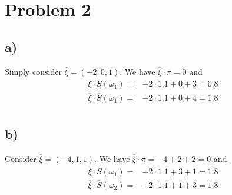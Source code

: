 \documentclass[a4paper]{article}
\theoremstyle{definition}
\begin{document}
\section*{Problem 2}
\subsection*{a)}
Simply consider \(\overline{\xi} = (-2, 0, 1)\). We have \(\overline{\xi} \cdot \overline{\pi} = 0\) and
\begin{align*}
    \overline{\xi} \cdot \overline{S}(\omega_1) =& -2 \cdot 1.1 + 0 + 3 = 0.8 \\
    \overline{\xi} \cdot \overline{S}(\omega_1) =& -2 \cdot 1.1 + 0 + 4 = 1.8 \\
\end{align*}

\subsection*{b)}
Consider \(\overline{\xi} = (-4, 1, 1)\). We have \(\overline{\xi} \cdot \overline{\pi} = -4 + 2 + 2 = 0\) and
\begin{align*}
    \overline{\xi} \cdot \overline{S}(\omega_1) =& -2 \cdot 1.1 + 3 + 1 = 1.8 \\    \overline{\xi} \cdot \overline{S}(\omega_2) =& -2 \cdot 1.1 + 1 + 3 = 1.8
\end{align*}
\end{document}
